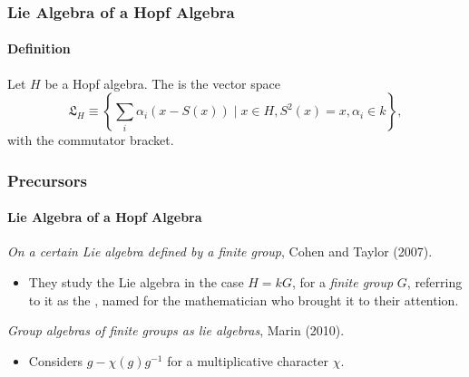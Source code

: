 \documentclass{beamer}
\begin{document}


\begin{frame}

\frametitle{Lie Algebra of a Hopf Algebra}

\framesubtitle{Definition}

Let $H$ be a Hopf algebra. The  is the vector space
\begin{equation}
\mathfrak{L}_H \equiv \left\lbrace \sum_i \alpha_i (x - S(x)) \mid x \in H, S^2(x) = x, \alpha_i \in k \right\rbrace,
\end{equation}
with the commutator bracket.


\end{frame}



\begin{frame}
\frametitle{Precursors}

\framesubtitle{Lie Algebra of a Hopf Algebra}



\textit{On a certain Lie algebra defined by a finite group}, Cohen and Taylor (2007).

\begin{itemize}
\item They study the Lie algebra in the case $H = kG$, for a \textit{finite group} $G$, referring to it as the , named for the mathematician who brought it to their attention.
\end{itemize}

\bigskip

\textit{Group algebras of finite groups as lie algebras}, Marin (2010).

\begin{itemize}
\item Considers $g - \chi(g) g^{-1}$ for a multiplicative character $\chi$.
\end{itemize}


\end{frame}





\end{document}
